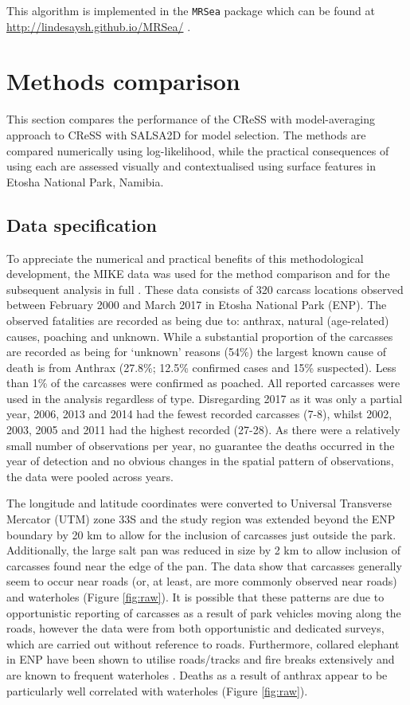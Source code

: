 \documentclass[letterpaper, 12pt]{interact}
\begin{document}
	This algorithm is implemented in the \texttt{MRSea} package which can be found at \url{http://lindesaysh.github.io/MRSea/} \citep{scott2017}.
	
	
	\section*{Methods comparison}\label{methods-comparison}
	
	This section compares the performance of the CReSS with model-averaging approach to CReSS with SALSA2D for model selection. The methods are compared numerically using log-likelihood, while the practical consequences of using each are assessed visually and contextualised using surface features in Etosha National Park, Namibia.
	
	\subsection*{Data specification}\label{data-specification}
	
	To appreciate the numerical and practical benefits of this methodological development, the MIKE data was used for the method comparison and for the subsequent analysis in full \cite{mike2018}. These data consists of 320 carcass locations observed between February 2000 and March 2017 in Etosha National Park (ENP). The observed fatalities are recorded as being due to: anthrax, natural (age-related) causes, poaching and unknown. While a substantial proportion of the carcasses are recorded as being for `unknown' reasons (54\%) the largest known cause of death is from Anthrax (27.8\%; 12.5\% confirmed cases and 15\% suspected). Less than 1\% of the carcasses were confirmed as poached. All reported carcasses were used in the analysis regardless of type. Disregarding 2017 as it was only a partial year, 2006, 2013 and 2014 had the fewest recorded carcasses (7-8), whilst 2002, 2003, 2005 and 2011 had the highest recorded (27-28). As there were a relatively small number of observations per year, no guarantee the deaths occurred in the year of detection and no obvious changes in the spatial pattern of observations, the data were pooled across years. 
	
	The longitude and latitude coordinates were converted to Universal Transverse Mercator (UTM) zone 33S and the study region was extended beyond the ENP boundary by 20 km to allow for the inclusion of carcasses just outside the park. Additionally, the large salt pan was reduced in size by 2 km to allow inclusion of carcasses found near the edge of the pan.  The data show that carcasses generally seem to occur near roads (or, at least, are more commonly observed near roads) and waterholes (Figure \ref{fig:raw}). It is possible that these patterns are due to opportunistic reporting of carcasses as a result of park vehicles moving along the roads, however the data were from both opportunistic and dedicated surveys, which are carried out without reference to roads. Furthermore, collared elephant in ENP have been shown to utilise roads/tracks and fire breaks extensively and are known to frequent waterholes \citep{Tsalyuk2019, chamaille2007}. Deaths as a result of anthrax appear to be particularly well correlated with waterholes (Figure \ref{fig:raw}).
	
\end{document}
